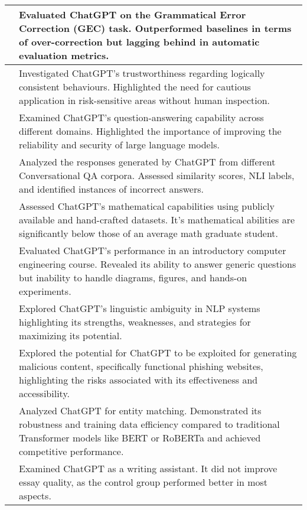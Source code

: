 \documentclass[11pt]{article}
\begin{document}
\begin{table*}
{\begin{tabular}{ll}
    \midrule
    \citet{wu2023chatgpt} &  Evaluated ChatGPT on the Grammatical Error Correction (GEC) task. Outperformed baselines in terms of over-correction but lagging behind in automatic evaluation metrics.\\
    \midrule
    \citet{jang2023consistency} &  Investigated ChatGPT's trustworthiness regarding logically consistent behaviours. Highlighted the need for cautious application in risk-sensitive areas without human inspection.\\
    \midrule
    \citet{shen2023chatgpt} &  Examined  ChatGPT's question-answering capability across different domains. Highlighted the importance of improving the reliability and security of large language models.\\
    \midrule
    \citet{rangapur2023chatgptcrawler} &  Analyzed the responses generated by ChatGPT from different Conversational QA corpora. Assessed similarity scores, NLI labels, and identified instances of incorrect answers.\\
    \midrule
    \citet{frieder2023mathematical} &  Assessed ChatGPT's mathematical capabilities using publicly available and hand-crafted datasets. It's mathematical abilities are significantly below those of an average math graduate student.\\
    \midrule
    \citet{deshpande2023analyzing} &  Evaluated ChatGPT's performance in an introductory computer engineering course. Revealed its ability to answer generic questions but inability to handle diagrams, figures, and hands-on experiments. \\  
    \midrule
    \citet{ortegamartín2023linguistic} &  Explored ChatGPT's linguistic ambiguity in NLP systems highlighting its strengths, weaknesses, and strategies for maximizing its potential. \\  
    \midrule
    \citet{roy2023generating} &      Explored  the potential for ChatGPT to be exploited for generating malicious content, specifically functional phishing websites, highlighting the risks associated with its effectiveness and accessibility. \\  
    \midrule
    \citet{peeters2023using} &      Analyzed ChatGPT for entity matching. Demonstrated its robustness and training data efficiency compared to traditional Transformer models like BERT or RoBERTa and achieved competitive performance.\\ 
    \midrule
    \citet{basic2023better} &      Examined ChatGPT as a writing assistant. It did not improve essay quality, as the control group performed better in most aspects.\\

\end{tabular}}
\end{table*}
\end{document}
